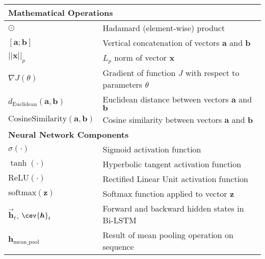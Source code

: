 \begin{appendices}
\begin{table}[htbp]
{\begin{tabular}{p{}p{}}
        \midrule
        \multicolumn{2}{l}{\textbf{Mathematical Operations}}                                                                               \\
        \midrule
        $\odot$                                     & Hadamard (element-wise) product                                                      \\
        $[\bm{a};\bm{b}]$                           & Vertical concatenation of vectors $\bm{a}$ and $\bm{b}$                              \\
        $||\bm{x}||_p$                              & $L_p$ norm of vector $\bm{x}$                                                        \\
        $\nabla J(\theta)$                          & Gradient of function $J$ with respect to parameters $\theta$                         \\
        $d_{\text{Euclidean}}(\bm{a},\bm{b})$       & Euclidean distance between vectors $\bm{a}$ and $\bm{b}$                             \\
        $\text{CosineSimilarity}(\bm{a},\bm{b})$    & Cosine similarity between vectors $\bm{a}$ and $\bm{b}$                              \\
        \midrule
        \multicolumn{2}{l}{\textbf{Neural Network Components}}                                                                             \\
        \midrule
        $\sigma(\cdot)$                             & Sigmoid activation function                                                          \\
        $\tanh(\cdot)$                              & Hyperbolic tangent activation function                                               \\
        $\text{ReLU}(\cdot)$                        & Rectified Linear Unit activation function                                            \\
        $\text{softmax}(\bm{z})$                    & Softmax function applied to vector $\bm{z}$                                          \\
        $\vec{\bm{h}}_t$, $\cev{\bm{h}}_t$          & Forward and backward hidden states in Bi-LSTM                                        \\
        $\bm{h}_{\text{mean\_pool}}$                & Result of mean pooling operation on sequence                                         \\

\end{tabular}}
\end{table}
\end{appendices}
